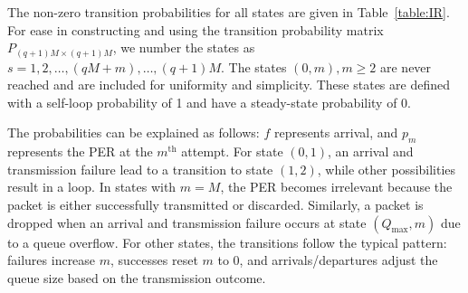 The non-zero transition probabilities for all states are given in Table~\ref{table:IR}. For ease in constructing and using the transition probability matrix $P_{(q+1)M\times (q+1)M}$, we number the states as $s=1,2,\dots,(qM+m),\dots,(q+1)M$. The states $(0,m), m \geq 2$ are never reached and are included for uniformity and simplicity. These states are defined with a self-loop probability of 1 and have a steady-state probability of 0.



The probabilities can be explained as follows: $f$ represents arrival, and $p_m$ represents the PER at the $m^{\mathrm{th}}$ attempt. For state $(0,1)$, an arrival and transmission failure lead to a transition to state $(1,2)$, while other possibilities result in a loop. In states with $m=M$, the PER becomes irrelevant because the packet is either successfully transmitted or discarded. Similarly, a packet is dropped when an arrival and transmission failure occurs at state $(Q_{\mathrm{max}},m)$ due to a queue overflow. For other states, the transitions follow the typical pattern: failures increase $m$, successes reset $m$ to 0, and arrivals/departures adjust the queue size based on the transmission outcome.

